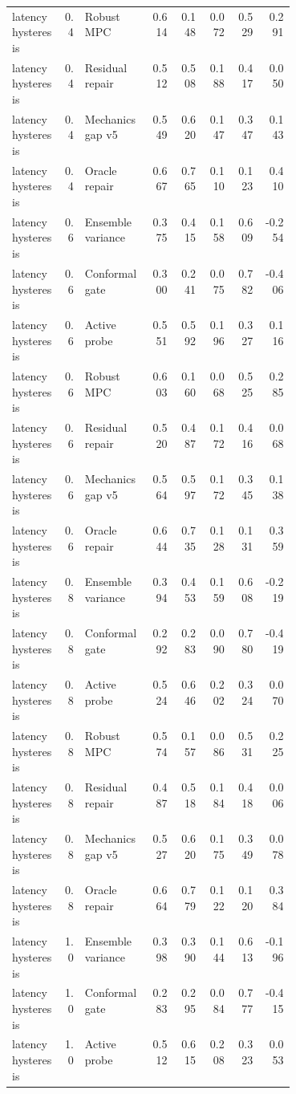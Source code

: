 \documentclass{article}
\begin{document}
\begin{center}
\begin{longtable}{p{0.18\linewidth}rp{0.23\linewidth}rrrrr}
latency hysteresis & 0.4 & Robust MPC & 0.614 & 0.148 & 0.072 & 0.529 & 0.291\\
latency hysteresis & 0.4 & Residual repair & 0.512 & 0.508 & 0.188 & 0.417 & 0.050\\
latency hysteresis & 0.4 & Mechanics gap v5 & 0.549 & 0.620 & 0.147 & 0.347 & 0.143\\
latency hysteresis & 0.4 & Oracle repair & 0.667 & 0.765 & 0.110 & 0.123 & 0.410\\
latency hysteresis & 0.6 & Ensemble variance & 0.375 & 0.415 & 0.158 & 0.609 & -0.254\\
latency hysteresis & 0.6 & Conformal gate & 0.300 & 0.241 & 0.075 & 0.782 & -0.406\\
latency hysteresis & 0.6 & Active probe & 0.551 & 0.592 & 0.196 & 0.327 & 0.116\\
latency hysteresis & 0.6 & Robust MPC & 0.603 & 0.160 & 0.068 & 0.525 & 0.285\\
latency hysteresis & 0.6 & Residual repair & 0.520 & 0.487 & 0.172 & 0.416 & 0.068\\
latency hysteresis & 0.6 & Mechanics gap v5 & 0.564 & 0.597 & 0.172 & 0.345 & 0.138\\
latency hysteresis & 0.6 & Oracle repair & 0.644 & 0.735 & 0.128 & 0.131 & 0.359\\
latency hysteresis & 0.8 & Ensemble variance & 0.394 & 0.453 & 0.159 & 0.608 & -0.219\\
latency hysteresis & 0.8 & Conformal gate & 0.292 & 0.283 & 0.090 & 0.780 & -0.419\\
latency hysteresis & 0.8 & Active probe & 0.524 & 0.646 & 0.202 & 0.324 & 0.070\\
latency hysteresis & 0.8 & Robust MPC & 0.574 & 0.157 & 0.086 & 0.531 & 0.225\\
latency hysteresis & 0.8 & Residual repair & 0.487 & 0.518 & 0.184 & 0.418 & 0.006\\
latency hysteresis & 0.8 & Mechanics gap v5 & 0.527 & 0.620 & 0.175 & 0.349 & 0.078\\
latency hysteresis & 0.8 & Oracle repair & 0.664 & 0.779 & 0.122 & 0.120 & 0.384\\
latency hysteresis & 1.0 & Ensemble variance & 0.398 & 0.390 & 0.144 & 0.613 & -0.196\\
latency hysteresis & 1.0 & Conformal gate & 0.283 & 0.295 & 0.084 & 0.777 & -0.415\\
latency hysteresis & 1.0 & Active probe & 0.512 & 0.615 & 0.208 & 0.323 & 0.053\\

\end{longtable}
\end{center}
\end{document}
